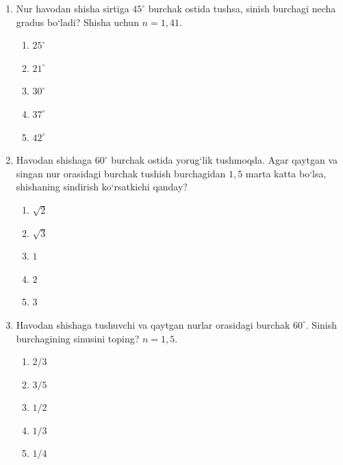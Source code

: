 \begin{enumerate}

\begin{enumerate}[label=\Alph*)]
\item $5/3$
\item $25/9$
\item $1$
\item $16/9$
\item $25/16$
\end{enumerate}

\item Nur havodan shisha sirtiga $45^\circ$ burchak ostida tushsa, sinish burchagi necha gradus bo‘ladi? Shisha uchun $n=1,41$.
\begin{enumerate}[label=\Alph*)]
\item $25^\circ$
\item $21^\circ$
\item $30^\circ$
\item $37^\circ$
\item $42^\circ$
\end{enumerate}

\item Havodan shishaga $60^\circ$ burchak ostida yorug‘lik tushmoqda. Agar qaytgan va singan nur orasidagi burchak tushish burchagidan $1,5$ marta katta bo‘lsa, shishaning sindirish ko‘rsatkichi qanday?
\begin{enumerate}[label=\Alph*)]
\item $\sqrt{2}$
\item $\sqrt{3}$
\item $1$
\item $2$
\item $3$
\end{enumerate}

\item Havodan shishaga tushuvchi va qaytgan nurlar orasidagi burchak $60^\circ$. Sinish burchagining sinusini toping? $n=1,5$.
\begin{enumerate}[label=\Alph*)]
\item $2/3$
\item $3/5$
\item $1/2$
\item $1/3$
\item $1/4$
\end{enumerate}


\end{enumerate}
